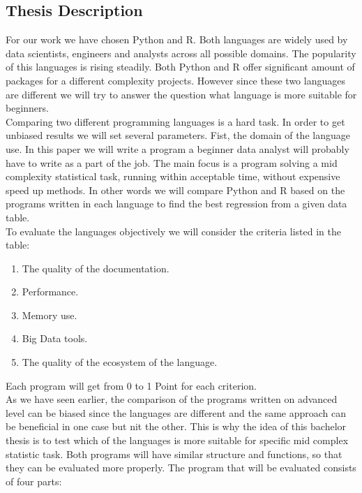 \documentclass [twoside,
  11pt, a4paper,
  footinclude=true,
  headinclude=true,
  cleardoublepage=empty
]{article}
\begin{document}
\subsection{Thesis Description}
For our work we have chosen Python and R. Both languages are widely used by data scientists, engineers and analysts across all possible domains. The popularity of this languages is rising steadily. Both Python and R offer significant amount of packages for a different complexity projects. However since these two languages are different we will try to answer the question what language is more suitable for beginners.\\
Comparing two different programming languages is a hard task. In order to get unbiased results we will set several parameters. Fist, the domain of the language use. In this paper we will write a program a beginner data analyst will probably have to write as a part of the job. The main focus is a program solving a mid complexity statistical task, running within acceptable time, without expensive speed up methods. In other words we will compare Python and R based on the programs written in each language to find the best regression from a given data table.\\
To evaluate the languages objectively we will consider the criteria listed in the table:
\begin{enumerate}
    \item The quality of the documentation. 
    \item Performance.
    \item Memory use.
    \item Big Data tools.
    \item The quality of the ecosystem of the language.
\end{enumerate}
Each program will get from 0 to 1 Point for each criterion. \\
As we have seen earlier, the comparison of the programs written on advanced level can be biased since the languages are different and the same approach can be beneficial in one case but nit the other. This is why the idea of this bachelor thesis is to test which of the languages is more suitable for specific mid complex statistic task. Both programs will have similar structure and functions, so that they can be evaluated more properly. The program that will be evaluated consists of four parts:
\end{document}
